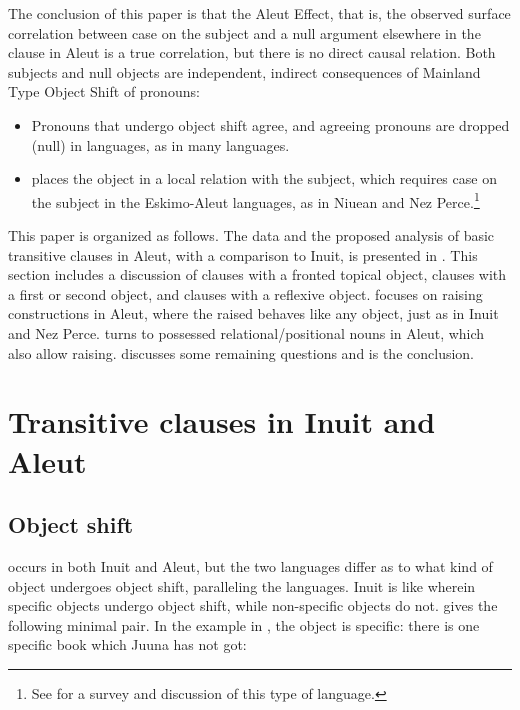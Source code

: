 \documentclass[output=paper]{LSP/langsci}
\begin{document}
The conclusion of this paper is that the Aleut Effect, that is, the observed surface correlation between  case on the subject and a null argument elsewhere in the clause in Aleut is a true correlation, but there is no direct causal relation. Both  subjects and null objects are independent, indirect consequences of Mainland Type Object Shift of pronouns: 

\begin{itemize}
\item
Pronouns that undergo object shift agree, and agreeing pronouns are dropped (null) in  languages, as in many languages.
\item
{} places the object in a local relation with the subject, which requires  case on the subject in the Eskimo-Aleut languages, as in Niuean and Nez Perce.\footnote{See \citet{woolford2015ergativity} for a survey and discussion of this type of  language.}
\end{itemize}

This paper is organized as follows. The data and the proposed analysis of basic transitive clauses in Aleut, with a comparison to Inuit, is presented in . This section includes a discussion of clauses with a fronted topical object, clauses with a first or second  object, and clauses with a reflexive object.  focuses on  raising constructions in Aleut, where the raised  behaves like any object, just as in Inuit and Nez Perce.  turns to possessed relational/positional nouns in Aleut, which also allow  raising.  discusses some remaining questions and  is the conclusion.

\section{Transitive clauses in Inuit and Aleut}\label{sec:woolford:2} 
\subsection{Object shift}

 occurs in both Inuit and Aleut, but the two languages differ as to what kind of object undergoes object shift, paralleling the  languages. Inuit is like  wherein specific objects undergo object shift, while non-specific objects do not. \citet{bittner1994case} gives the following minimal pair. In the example in , the object is specific: there is one specific book which Juuna has not got:
\end{document}
